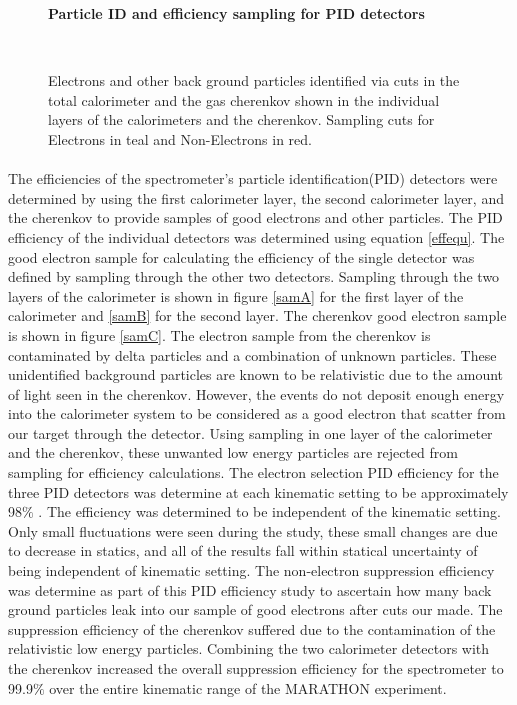 \begin{figure}[t]%
	{\centering
		\textbf{Particle ID and efficiency sampling for PID detectors }\par\medskip}
	\centering
	\\
	\caption{Electrons and other back ground particles identified via cuts in the total calorimeter and the gas cherenkov shown in the individual layers of the calorimeters and the cherenkov. Sampling cuts for Electrons in teal and Non-Electrons in red.}%
	\label{sampling}%
\end{figure}


\paragraph{}The efficiencies of the spectrometer's particle identification(PID) detectors were determined by using the first calorimeter layer, the second calorimeter layer, and the cherenkov to provide samples of good electrons and other particles. The PID efficiency of the individual detectors was determined using equation \ref{effequ}. The good electron sample for calculating the efficiency of the single detector was defined by sampling through the other two detectors. Sampling through the two layers of the calorimeter is shown in figure \ref{samA} for the first layer of the calorimeter and \ref{samB} for the second layer. The cherenkov good electron sample is shown in figure \ref{samC}. The electron sample from the cherenkov is contaminated by delta particles and a combination of unknown particles. These unidentified background particles are known to be relativistic due to the amount of light seen in the cherenkov. However, the events do not deposit enough energy into the calorimeter system to be considered as a good electron that scatter from our target through the detector. Using sampling in one layer of the calorimeter and the cherenkov, these unwanted low energy particles are rejected from sampling for efficiency calculations. The electron selection PID efficiency for the three PID detectors was determine at each kinematic setting to be approximately 98$\%$ . The efficiency was determined to be independent of the kinematic setting. Only small fluctuations were seen during the study, these small changes are due to decrease in statics, and all of the results fall within statical uncertainty of being independent of kinematic setting. The non-electron suppression efficiency was determine as part of this PID efficiency study to ascertain how many back ground particles leak into our sample of good electrons after cuts our made. The suppression efficiency of the cherenkov suffered due to the contamination of the relativistic low energy particles. Combining the two calorimeter detectors with the cherenkov increased the overall suppression efficiency for the spectrometer to 99.9$\%$ over the entire kinematic range of the MARATHON experiment. 

